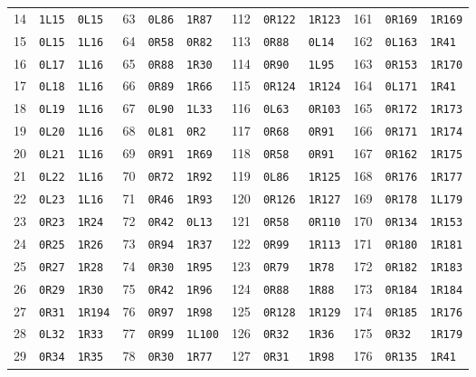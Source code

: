 \begin{center}
\begin{tabular}{@{}rll@{\quad}rll@{\quad}rll@{\quad}rll@{}}
14&\texttt{1L15}&\texttt{0L15}&63&\texttt{0L86}&\texttt{1R87}&112&\texttt{0R122}&\texttt{1R123}&161&\texttt{0R169}&\texttt{1R169}\\
15&\texttt{0L15}&\texttt{1L16}&64&\texttt{0R58}&\texttt{0R82}&113&\texttt{0R88}&\texttt{0L14}&162&\texttt{0L163}&\texttt{1R41}\\
16&\texttt{0L17}&\texttt{1L16}&65&\texttt{0R88}&\texttt{1R30}&114&\texttt{0R90}&\texttt{1L95}&163&\texttt{0R153}&\texttt{1R170}\\
17&\texttt{0L18}&\texttt{1L16}&66&\texttt{0R89}&\texttt{1R66}&115&\texttt{0R124}&\texttt{1R124}&164&\texttt{0L171}&\texttt{1R41}\\
18&\texttt{0L19}&\texttt{1L16}&67&\texttt{0L90}&\texttt{1L33}&116&\texttt{0L63}&\texttt{0R103}&165&\texttt{0R172}&\texttt{1R173}\\
19&\texttt{0L20}&\texttt{1L16}&68&\texttt{0L81}&\texttt{0R2}&117&\texttt{0R68}&\texttt{0R91}&166&\texttt{0R171}&\texttt{1R174}\\
20&\texttt{0L21}&\texttt{1L16}&69&\texttt{0R91}&\texttt{1R69}&118&\texttt{0R58}&\texttt{0R91}&167&\texttt{0R162}&\texttt{1R175}\\
21&\texttt{0L22}&\texttt{1L16}&70&\texttt{0R72}&\texttt{1R92}&119&\texttt{0L86}&\texttt{1R125}&168&\texttt{0R176}&\texttt{1R177}\\
22&\texttt{0L23}&\texttt{1L16}&71&\texttt{0R46}&\texttt{1R93}&120&\texttt{0R126}&\texttt{1R127}&169&\texttt{0R178}&\texttt{1L179}\\
23&\texttt{0R23}&\texttt{1R24}&72&\texttt{0R42}&\texttt{0L13}&121&\texttt{0R58}&\texttt{0R110}&170&\texttt{0R134}&\texttt{1R153}\\
24&\texttt{0R25}&\texttt{1R26}&73&\texttt{0R94}&\texttt{1R37}&122&\texttt{0R99}&\texttt{1R113}&171&\texttt{0R180}&\texttt{1R181}\\
25&\texttt{0R27}&\texttt{1R28}&74&\texttt{0R30}&\texttt{1R95}&123&\texttt{0R79}&\texttt{1R78}&172&\texttt{0R182}&\texttt{1R183}\\
26&\texttt{0R29}&\texttt{1R30}&75&\texttt{0R42}&\texttt{1R96}&124&\texttt{0R88}&\texttt{1R88}&173&\texttt{0R184}&\texttt{1R184}\\
27&\texttt{0R31}&\texttt{1R194}&76&\texttt{0R97}&\texttt{1R98}&125&\texttt{0R128}&\texttt{1R129}&174&\texttt{0R185}&\texttt{1R176}\\
28&\texttt{0L32}&\texttt{1R33}&77&\texttt{0R99}&\texttt{1L100}&126&\texttt{0R32}&\texttt{1R36}&175&\texttt{0R32}&\texttt{1R179}\\
29&\texttt{0R34}&\texttt{1R35}&78&\texttt{0R30}&\texttt{1R77}&127&\texttt{0R31}&\texttt{1R98}&176&\texttt{0R135}&\texttt{1R41}\\

\end{tabular}
\end{center}

